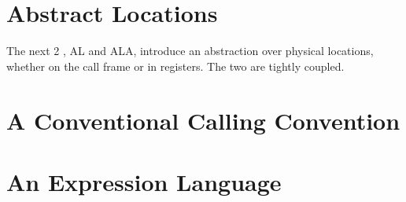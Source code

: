 \documentclass[main.tex]{subfiles}
\begin{document}
\section{Abstract Locations}
The next 2 \ils{}, AL and ALA, introduce an abstraction over physical locations, whether on the call frame or in registers. The two \ils{} are tightly coupled.


\section{A Conventional Calling Convention}

\section{An Expression Language}

\biblio{}
\onlyinsubfile{\glsaddall\printglossaries}
\end{document}
